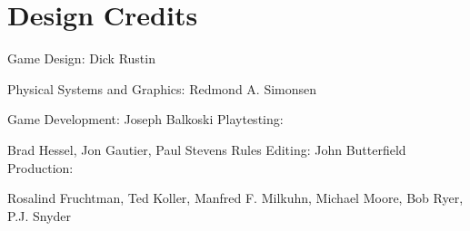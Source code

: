 \section*{Design Credits}
Game Design: Dick Rustin

Physical Systems and Graphics: Redmond A. Simonsen

Game Development: Joseph Balkoski Playtesting:

Brad Hessel, Jon Gautier, Paul Stevens Rules Editing: John Butterfield Production:

Rosalind Fruchtman, Ted Koller, Manfred F. Milkuhn, Michael Moore, Bob Ryer, P.J. Snyder
